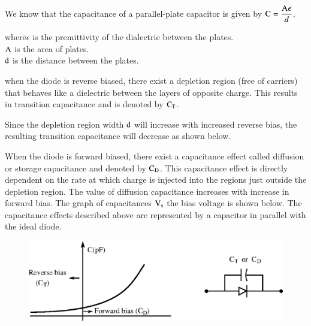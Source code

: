 We know that the capacitance of a parallel-plate capacitor is given by $\textrm{C}=\dfrac{\textrm{A}\epsilon}{d}$.

\begin{tabbing}
where\quad \=$\epsilon$ is the premittivity of the dialectric between the plates.\\[3pt]
\>$\textrm{A}$ is the area of plates.\\[3pt]
\>$\textrm{d}$ is the distance between the plates.
\end{tabbing}

\noindent
when the diode is reverse biased, there exist a depletion region (free of carriers) that behaves like a dielectric between the layers of opposite charge. This results in transition capacitance and is denoted by $\textrm{C}_{\textrm{T}}$.

Since the depletion region width $\textrm{d}$ will increase with increased reverse bias, the resulting transition capacitance will decrease as shown below.

When the diode is forward biased, there exist a capacitance effect called diffusion or storage capacitance and denoted by $\textrm{C}_{\textrm{D}}$. This capacitance effect is directly dependent on the rate at which charge is injected into the regions just outside the depletion region. The value of diffusion capacitance increases with increase in forward bias. The graph of capacitances $\textrm{V}_{\textrm{s}}$ the bias voltage is shown below. The capacitance effects described above are represented by a capacitor in parallel with the ideal diode.
\begin{figure}[H]
\centering
\includegraphics{chap1/addfig1.eps}
\end{figure}


